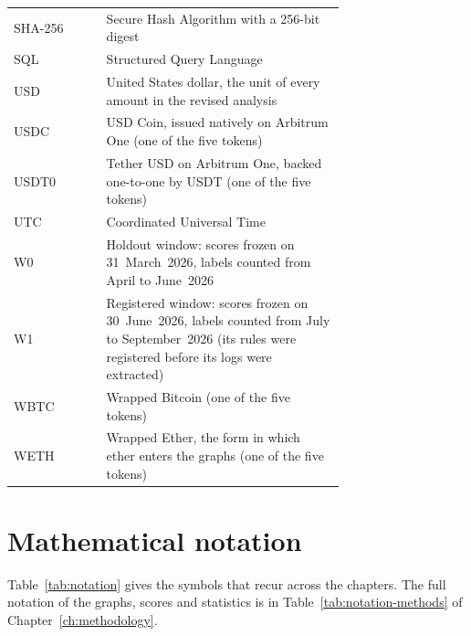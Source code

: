 \begin{table}[htbp]
{\begin{tabular}{lp{0.72\linewidth}}
SHA-256 & Secure Hash Algorithm with a 256-bit digest \\
SQL & Structured Query Language \\
USD & United States dollar, the unit of every amount in the revised analysis \\
USDC & USD Coin, issued natively on Arbitrum One (one of the five tokens) \\
USDT0 & Tether USD on Arbitrum One, backed one-to-one by USDT (one of the five tokens) \\
UTC & Coordinated Universal Time \\
W0 & Holdout window: scores frozen on 31~March~2026, labels counted from April to June~2026 \\
W1 & Registered window: scores frozen on 30~June~2026, labels counted from July to September~2026 (its rules were registered before its logs were extracted) \\
WBTC & Wrapped Bitcoin (one of the five tokens) \\
WETH & Wrapped Ether, the form in which ether enters the graphs (one of the five tokens) \\
\bottomrule
\end{tabular}
}
\end{table}

\section*{Mathematical notation}
\label{sec:notation-table}

Table~\ref{tab:notation} gives the symbols that recur across the chapters. The full notation of the graphs, scores and statistics is in Table~\ref{tab:notation-methods} of Chapter~\ref{ch:methodology}.

